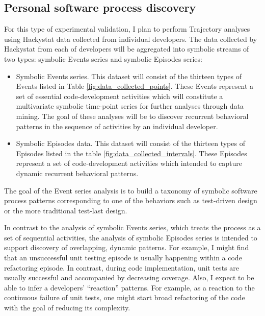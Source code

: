 \subsection{Personal software process discovery}
For this type of experimental validation, I plan to perform Trajectory analyses using Hackystat data collected from individual developers. The data collected by Hackystat from each of developers will be aggregated into symbolic streams of two types: symbolic Events series and symbolic Episodes series:
\begin{itemize}
	\item Symbolic Events series. This dataset will consist of the thirteen types of Events listed in Table \ref{fig:data_collected_points}. These Events represent a set of essential code-development activities which will constitute a multivariate symbolic time-point series for further analyses through data mining. The goal of these analyses will be to discover recurrent behavioral patterns in the sequence of activities by an individual developer. 
	\item Symbolic Episodes data. This dataset will consist of the thirteen types of Episodes listed in the table \ref{fig:data_collected_intervals}. These Episodes represent a set of code-development activities which intended to capture dynamic recurrent behavioral patterns.
\end{itemize}

The goal of the Event series analysis is to build a taxonomy of symbolic software process patterns corresponding to one of the behaviors such as test-driven design or the more traditional test-last design.

In contrast to the analysis of symbolic Events series, which treats the process as a set of sequential activities, the analysis of symbolic Episodes series is intended to support discovery of overlapping, dynamic patterns. For example, I might find that an unsuccessful unit testing episode is usually happening within a code refactoring episode. In contrast, during code implementation, unit tests are usually successful and accompanied by decreasing coverage. Also, I expect to be able to infer a developers' ``reaction'' patterns. For example, as a reaction to the continuous failure of unit tests, one might start broad refactoring of the code with the goal of reducing its complexity. 

